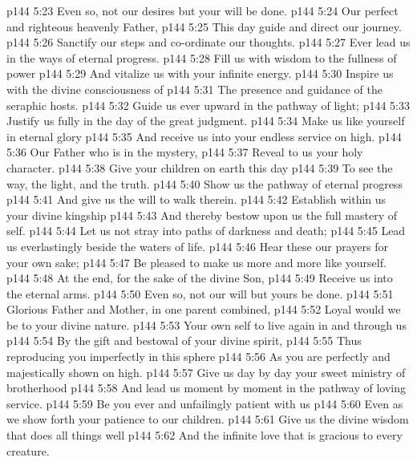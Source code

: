 \vs p144 5:23 Even so, not our desires but your will be done.
\separatorshort
\vs p144 5:24 Our perfect and righteous heavenly Father,
\vs p144 5:25 \hsetoff This day guide and direct our journey.
\vs p144 5:26 Sanctify our steps and co\hyp{}ordinate our thoughts.
\vs p144 5:27 \hsetoff Ever lead us in the ways of eternal progress.
\vs p144 5:28 Fill us with wisdom to the fullness of power
\vs p144 5:29 \hsetoff And vitalize us with your infinite energy.
\vs p144 5:30 Inspire us with the divine consciousness of
\vs p144 5:31 \hsetoff The presence and guidance of the seraphic hosts.
\vs p144 5:32 Guide us ever upward in the pathway of light;
\vs p144 5:33 \hsetoff Justify us fully in the day of the great judgment.
\vs p144 5:34 Make us like yourself in eternal glory
\vs p144 5:35 \hsetoff And receive us into your endless service on high.
\separatorshort
\vs p144 5:36 Our Father who is in the mystery,
\vs p144 5:37 \hsetoff Reveal to us your holy character.
\vs p144 5:38 Give your children on earth this day
\vs p144 5:39 \hsetoff To see the way, the light, and the truth.
\vs p144 5:40 Show us the pathway of eternal progress
\vs p144 5:41 \hsetoff And give us the will to walk therein.
\vs p144 5:42 Establish within us your divine kingship
\vs p144 5:43 \hsetoff And thereby bestow upon us the full mastery of self.
\vs p144 5:44 Let us not stray into paths of darkness and death;
\vs p144 5:45 \hsetoff Lead us everlastingly beside the waters of life.
\vs p144 5:46 Hear these our prayers for your own sake;
\vs p144 5:47 \hsetoff Be pleased to make us more and more like yourself.
\vs p144 5:48 At the end, for the sake of the divine Son,
\vs p144 5:49 \hsetoff Receive us into the eternal arms.
\vs p144 5:50 Even so, not our will but yours be done.
\separatorshort
\vs p144 5:51 Glorious Father and Mother, in one parent combined,
\vs p144 5:52 \hsetoff Loyal would we be to your divine nature.
\vs p144 5:53 Your own self to live again in and through us
\vs p144 5:54 \hsetoff By the gift and bestowal of your divine spirit,
\vs p144 5:55 Thus reproducing you imperfectly in this sphere
\vs p144 5:56 \hsetoff As you are perfectly and majestically shown on high.
\vs p144 5:57 Give us day by day your sweet ministry of brotherhood
\vs p144 5:58 \hsetoff And lead us moment by moment in the pathway of loving service.
\vs p144 5:59 Be you ever and unfailingly patient with us
\vs p144 5:60 \hsetoff Even as we show forth your patience to our children.
\vs p144 5:61 Give us the divine wisdom that does all things well
\vs p144 5:62 \hsetoff And the infinite love that is gracious to every creature.
